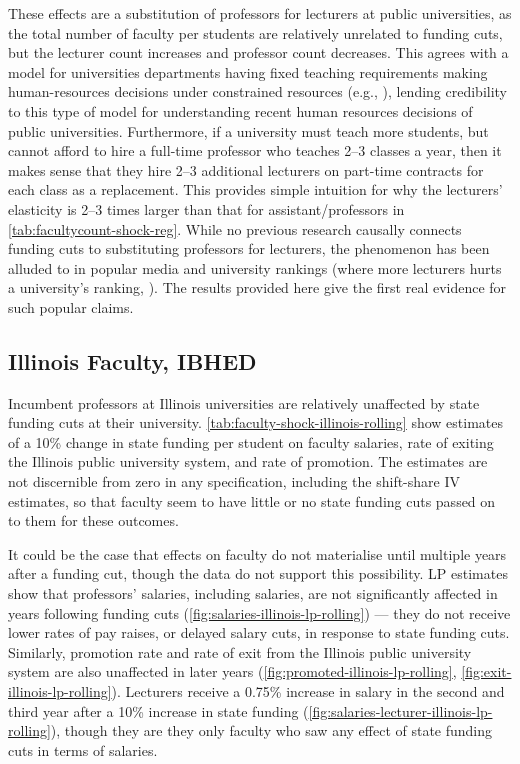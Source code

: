These effects are a substitution of professors for lecturers at public universities, as the total number of faculty per students are relatively unrelated to funding cuts, but the lecturer count increases and professor count decreases.
This agrees with a model for universities departments having fixed teaching requirements making human-resources decisions under constrained resources (e.g., \citealt{abe2015implications}), lending credibility to this type of model for understanding recent human resources decisions of public universities.
Furthermore, if a university must teach more students, but cannot afford to hire a full-time professor who teaches 2--3 classes a year, then it makes sense that they hire 2--3 additional lecturers on part-time contracts for each class as a replacement.
This provides simple intuition for why the lecturers' elasticity is 2--3 times larger than that for assistant/professors in \autoref{tab:facultycount-shock-reg}.
While no previous research causally connects funding cuts to substituting professors for lecturers, the phenomenon has been alluded to in popular media \citep{wiu2016} and university rankings (where more lecturers hurts a university's ranking, \citealt{usnews2023}).
The results provided here give the first real evidence for such popular claims.

\subsection{Illinois Faculty, IBHED}
Incumbent professors at Illinois universities are relatively unaffected by state funding cuts at their university.
\autoref{tab:faculty-shock-illinois-rolling} show estimates of a 10\% change in state funding per student on faculty salaries, rate of exiting the Illinois public university system, and rate of promotion.
The estimates are not discernible from zero in any specification, including the shift-share IV estimates, so that faculty seem to have little or no state funding cuts passed on to them for these outcomes.

It could be the case that effects on faculty do not materialise until multiple years after a funding cut, though the data do not support this possibility.
LP estimates show that professors' salaries, including salaries, are not significantly affected in years following funding cuts (\autoref{fig:salaries-illinois-lp-rolling}) --- they do not receive lower rates of pay raises, or delayed salary cuts, in response to state funding cuts.
Similarly, promotion rate and rate of exit from the Illinois public university system are also unaffected in later years (\autoref{fig:promoted-illinois-lp-rolling}, \ref{fig:exit-illinois-lp-rolling}).
Lecturers receive a 0.75\% increase in salary in the second and third year after a 10\% increase in state funding (\autoref{fig:salaries-lecturer-illinois-lp-rolling}), though they are they only faculty who saw any effect of state funding cuts in terms of salaries.

